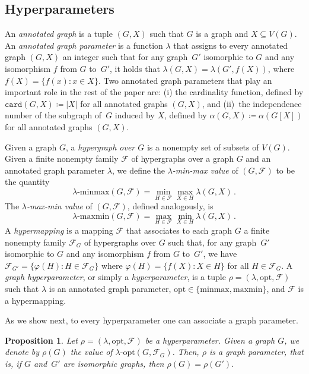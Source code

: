 \documentclass[11pt]{article}
\newcommand{\minmax}{\mathrm{minmax}}
\newcommand{\maxmin}{\mathrm{maxmin}}
\theoremstyle{plain}
\newtheorem{proposition}[theorem]{Proposition}
\theoremstyle{definition}
\theoremstyle{remark}
\numberwithin{equation}{section}
\begin{document}
\subsection{Hyperparameters}\label{sec:hyperparameters}

An \emph{annotated graph} is a tuple $(G,X)$ such that $G$ is a graph and $X\subseteq V(G)$.
An \emph{annotated graph parameter} is a function $\lambda$ that assigns to every annotated graph $(G,X)$ an integer such that for any graph~$G'$ isomorphic to $G$ and any isomorphism $f$ from $G$ to~$G'$, it holds that $\lambda(G,X) = \lambda(G',f(X))$, where $f(X) = \{f(x)\colon x\in X\}$.
Two annotated graph parameters that play an important role in the rest of the paper are: (i) the cardinality function, defined by $\mathtt{card}(G,X) \coloneqq |X|$ for all annotated graphs $(G,X)$, and (ii)~the independence number of the subgraph of~$G$ induced by $X$, defined by $\alpha(G,X) \coloneqq \alpha(G[X])$ for all annotated graphs $(G,X)$.

Given a graph $G$, a \emph{hypergraph over $G$} is a nonempty set of subsets of $V(G)$.
Given a finite nonempty family $\mathcal{F}$ of hypergraphs over a graph $G$ and an annotated graph parameter $\lambda$, we define the \emph{$\lambda$-min-max value} of $(G,\mathcal{F})$ to be the quantity \[\lambda\text{-}\minmax(G,\mathcal{F})= \min_{H\in \mathcal{F}}\max_{X\in H}\lambda(G,X)\,.\]
The \emph{$\lambda$-max-min value} of $(G,\mathcal{F})$, defined analogously, is
\[\lambda\text{-}\maxmin(G,\mathcal{F})= \max_{H\in \mathcal{F}}\min_{X\in H}\lambda(G,X)\,.\]
A \emph{hypermapping} is a mapping $\mathcal{F}$ that associates to each graph $G$ a finite nonempty family $\mathcal{F}_G$ of hypergraphs over $G$ such that, for any graph~$G'$ isomorphic to $G$ and any isomorphism $f$ from $G$ to~$G'$, we have $\mathcal{F}_{G'} = \{\varphi(H)\colon H\in \mathcal{F}_G\}$ where $\varphi(H) = \{f(X)\colon X\in H\}$ for all $H\in \mathcal{F}_G$.
A \emph{graph hyperparameter}, or simply a \emph{hyperparameter}, is a tuple $\rho = (\lambda, \mathrm{opt}, \mathcal{F})$ such that $\lambda$ is an annotated graph parameter, \hbox{$\mathrm{opt}\in \{\mathrm{minmax},\mathrm{maxmin}\}$}, and $\mathcal{F}$ is a hypermapping.

As we show next, to every hyperparameter one can associate a graph parameter.

\begin{proposition}\label{hyperparameter-to-parameter}
Let $\rho = (\lambda, \mathrm{opt}, \mathcal{F})$ be a hyperparameter.
Given a graph $G$, we denote by $\rho(G)$ the value of $\lambda\text{-}\mathrm{opt}(G,\mathcal{F}_G)$.
Then, $\rho$ is a graph parameter, that is, if $G$ and~$G'$ are isomorphic graphs, then $\rho(G) = \rho(G')$. 
\end{proposition}
\end{document}
